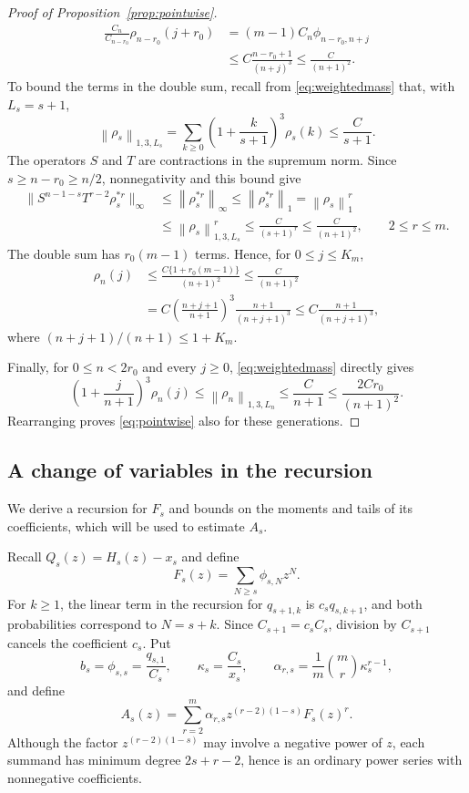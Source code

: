 \documentclass[11pt,letterpaper,reqno]{amsart}
\numberwithin{equation}{section}
\theoremstyle{plain}
\theoremstyle{remark}
\newcommand{\norm}[1]{\left\lVert#1\right\rVert}
\begin{document}
\begin{proof}[Proof of Proposition~\ref{prop:pointwise}]
\[
\begin{aligned}
 \frac{C_n}{C_{n-r_0}}\rho_{n-r_0}(j+r_0)
 &=(m-1)C_n\phi_{n-r_0,n+j}\\
 &\le C\frac{n-r_0+1}{(n+j)^3}
 \le\frac{C}{(n+1)^2}.
\end{aligned}
\]
To bound the terms in the double sum, recall from \eqref{eq:weightedmass} that, with $L_s=s+1$,
\[
 \norm{\rho_s}_{1,3,L_s}
 =\sum_{k\ge0}\left(1+\frac{k}{s+1}\right)^3\rho_s(k)
 \le\frac{C}{s+1}.
\]
The operators $S$ and $T$ are contractions in the supremum norm. Since $s\ge n-r_0\ge n/2$, nonnegativity and this bound give
\[
\begin{aligned}
 \bigl\|S^{n-1-s}T^{r-2}\rho_s^{*r}\bigr\|_\infty
 &\le\norm{\rho_s^{*r}}_\infty
 \le\norm{\rho_s^{*r}}_1
 =\norm{\rho_s}_1^r\\
 &\le\norm{\rho_s}_{1,3,L_s}^r
 \le\frac{C}{(s+1)^r}
 \le\frac{C}{(n+1)^2},
 \qquad 2\le r\le m.
\end{aligned}
\]
The double sum has $r_0(m-1)$ terms. Hence, for $0\le j\le K_m$,
\[
\begin{aligned}
 \rho_n(j)
 &\le\frac{C\{1+r_0(m-1)\}}{(n+1)^2}
 \le\frac{C}{(n+1)^2}\\
 &=C\left(\frac{n+j+1}{n+1}\right)^3
       \frac{n+1}{(n+j+1)^3}
 \le C\frac{n+1}{(n+j+1)^3},
\end{aligned}
\]
where $(n+j+1)/(n+1)\le1+K_m$.

Finally, for $0\le n<2r_0$ and every $j\ge0$, \eqref{eq:weightedmass} directly gives
\[
 \left(1+\frac{j}{n+1}\right)^3\rho_n(j)
 \le\norm{\rho_n}_{1,3,L_n}
 \le\frac{C}{n+1}
 \le\frac{2Cr_0}{(n+1)^2}.
\]
Rearranging proves \eqref{eq:pointwise} also for these generations.
\end{proof}

\subsection{A change of variables in the recursion}
We derive a recursion for $F_s$ and bounds on the moments and tails of its coefficients, which will be used to estimate $A_s$.

Recall $Q_s(z)=H_s(z)-x_s$ and define
\[
 F_s(z)=\sum_{N\ge s}\phi_{s,N}z^N.
\]
For $k\ge1$, the linear term in the recursion for $q_{s+1,k}$ is $c_sq_{s,k+1}$, and both probabilities correspond to $N=s+k$. Since $C_{s+1}=c_sC_s$, division by $C_{s+1}$ cancels the coefficient $c_s$. Put
\[
 b_s=\phi_{s,s}=\frac{q_{s,1}}{C_s},\qquad
 \kappa_s=\frac{C_s}{x_s},\qquad
 \alpha_{r,s}=\frac1m\binom mr\kappa_s^{r-1},
\]
and define
\begin{equation}\label{eq:arrivalA}
 A_s(z)=\sum_{r=2}^m\alpha_{r,s}z^{(r-2)(1-s)}F_s(z)^r.
\end{equation}
Although the factor $z^{(r-2)(1-s)}$ may involve a negative power of $z$, each summand has minimum degree $2s+r-2$, hence is an ordinary power series with nonnegative coefficients.
\end{document}
